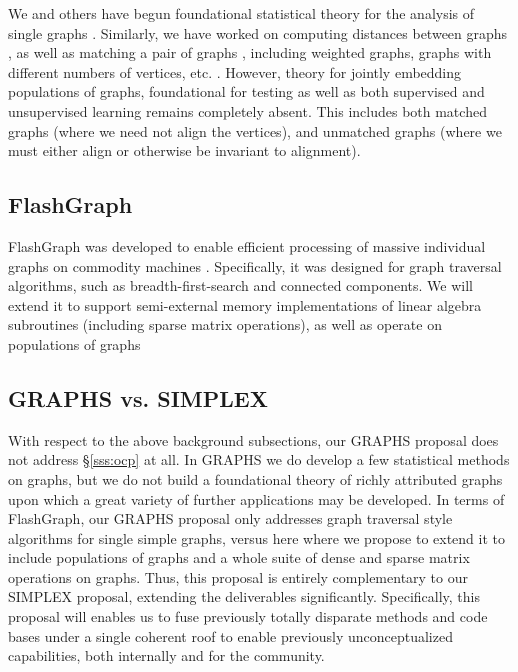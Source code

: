 We and others have begun foundational statistical theory for the analysis of single graphs \cite{Athreya2013, Sussman2012, rukhin2012on, Lee13a, Lee14a, Tang2013a, shuffled, Borges2011, Priebe2009a, Qin2013, lee2011random, Mhembere2013a, Wang2013a, signal-subgraph, Rukhin2011, ceyhan2007a, Tang11a, Grothendieck2010, Priebe2012, Sussman13, lee2011a, PCP10, Park2012a, Mhembere2013b, Sussman2012a, solka2002a, pilla2003adaptive, poston1997a, Naiman2001, ceyhan2006relative, Priebe2011c, Robinson2012, supervenience, RVC13, BVN, Abrams2002, Fishkind2012b, marchette2008predicting, priebe2003class}.  Similarly, we have worked on computing distances between graphs \cite{Tang14a}, as well as matching  a pair of graphs \cite{Vogelstein11a, Fishkind2012a, Lyzinski13a, Fiori13a, Lyzinski14a}, including weighted graphs, graphs with different numbers of vertices, etc. \cite{Lyzinski14b}.  However, theory for jointly embedding populations of graphs, foundational for testing as well as both supervised and unsupervised learning remains completely absent.  This includes both matched graphs (where we need not align the vertices), and unmatched graphs (where we must either align or otherwise be invariant to alignment).





\subsection[ FlashGraph]{FlashGraph} \label{sss:flash}

FlashGraph was developed to enable efficient processing of massive individual graphs on commodity machines \cite{Zheng14a}.  Specifically, it was designed for graph traversal algorithms, such as breadth-first-search and connected components.
We will extend it to support semi-external memory implementations of linear algebra subroutines (including sparse matrix operations), as well as operate on populations of graphs


\subsection[ GRAPHS vs. SIMPLEX]{GRAPHS vs. SIMPLEX}

With respect to the above background subsections, our GRAPHS proposal does not address \S \ref{sss:ocp} at all.  In GRAPHS we do develop a few statistical methods on graphs, but we do not build a foundational theory of richly attributed graphs upon which a great variety of further applications may be developed.  In terms of FlashGraph, our GRAPHS proposal only addresses graph traversal style algorithms for single simple graphs, versus here where we propose to extend it to include populations of graphs and a whole suite of dense and sparse matrix operations on graphs. Thus, this proposal is entirely complementary to our SIMPLEX proposal, extending the deliverables significantly. Specifically, this proposal will enables us to fuse previously totally disparate methods and code bases under a single coherent roof to enable previously unconceptualized capabilities, both internally and for the community.



